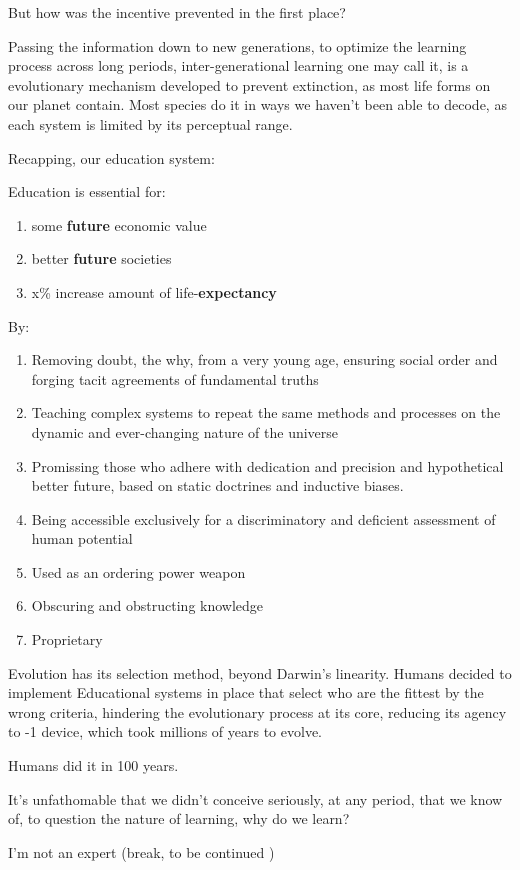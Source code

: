 \documentclass[
  letterpaper,
  DIV=11,
  numbers=noendperiod,
  oneside]{scrartcl}
\begin{document}
But how was the incentive prevented in the first place?

Passing the information down to new generations, to optimize the
learning process across long periods, inter-generational learning one
may call it, is a evolutionary mechanism developed to prevent
extinction, as most life forms on our planet contain. Most species do it
in ways we haven't been able to decode, as each system is limited by its
perceptual range.

Recapping, our education system:

Education is essential for:

\begin{enumerate}
\def\labelenumi{\arabic{enumi}.}
\item
  some \textbf{future} economic value
\item
  better \textbf{future} societies
\item
  x\% increase amount of life-\textbf{expectancy}
\end{enumerate}

By:

\begin{enumerate}
\def\labelenumi{\arabic{enumi}.}
\item
  Removing doubt, the why, from a very young age, ensuring social order
  and forging tacit agreements of fundamental truths
\item
  Teaching complex systems to repeat the same methods and processes on
  the dynamic and ever-changing nature of the universe
\item
  Promissing those who adhere with dedication and precision and
  hypothetical better future, based on static doctrines and inductive
  biases.
\item
  Being accessible exclusively for a discriminatory and deficient
  assessment of human potential
\item
  Used as an ordering power weapon
\item
  Obscuring and obstructing knowledge
\item
  Proprietary
\end{enumerate}

Evolution has its selection method, beyond Darwin's linearity. Humans
decided to implement Educational systems in place that select who are
the fittest by the wrong criteria, hindering the evolutionary process at
its core, reducing its agency to -1 device, which took millions of years
to evolve.

Humans did it in 100 years.

It's unfathomable that we didn't conceive seriously, at any period, that
we know of, to question the nature of learning, why do we learn?

I'm not an expert (break, to be continued )
\end{document}
